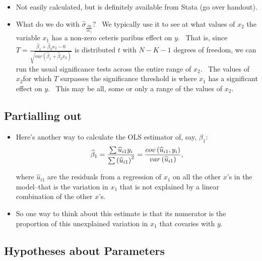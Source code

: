 \documentclass[11pt]{article}
\begin{document}
\begin{itemize}
\item Not easily calculated, but is definitely available from Stata (go over
handout).

\item What do we do with $\widehat{\sigma }_{\frac{\partial y}{\partial x_{1}%
}}?$ \ We typically use it to see at what values of $x_{2}$ the variable $%
x_{1}$ has a non-zero ceteris paribus effect on $y$. \ That is, since $T=%
\frac{\widehat{\beta }_{1}+\widehat{\beta }_{3}x_{2}-0}{\sqrt{var\left( 
\widehat{\beta }_{1}+\widehat{\beta }_{3}x_{2}\right) }}$ is distributed $t$
with $N-K-1$ degrees of freedom, we can run the usual significance tests
across the entire range of $x_{2}$. \ The values of $x_{2}$for which $T$
surpasses the significance threshold is where $x_{1}$ has a significant
effect on $y$. \ This may be all, some or only a range of the values of $%
x_{2}$.
\end{itemize}

\subsection{Partialling out}

\begin{itemize}
\item Here's another way to calculate the OLS estimator of, say, $\beta
_{1}: $%
\begin{equation*}
\widehat{\beta }_{1}=\frac{\sum \widehat{u}_{i1}y_{i}}{\sum \left( \widehat{u%
}_{i1}\right) ^{2}}=\frac{cov\left( \widehat{u}_{i1},y_{i}\right) }{%
var\left( \widehat{u}_{i1}\right) },
\end{equation*}

where $\widehat{u}_{i1}$ are the residuals from a regression of $x_{1}$ on
all the other $x$'s in the model--that is the variation in $x_{1}$ that is
not explained by a linear combination of the other $x$'s.

\item So one way to think about this estimate is that its numerator is the
proportion of this unexplained variation in $x_{1}$ that covaries with $y$.
\ 
\end{itemize}

\subsection{Hypotheses about Parameters}
\end{document}
